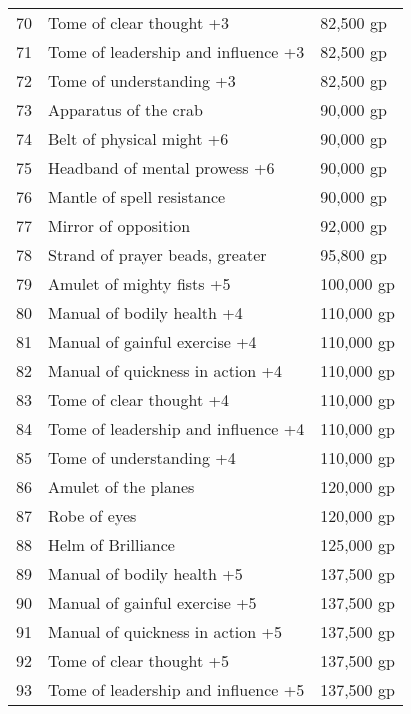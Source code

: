 \begin{table}[]
\begin{tabularx}{\linewidth}{lXl}
70  & Tome of clear thought +3                       & 82,500 gp    \\
71  & Tome of leadership and influence +3            & 82,500 gp    \\
72  & Tome of understanding +3                       & 82,500 gp    \\
73  & Apparatus of the crab                          & 90,000 gp    \\
74  & Belt of physical might +6                      & 90,000 gp    \\
75  & Headband of mental prowess +6                  & 90,000 gp    \\
76  & Mantle of spell resistance                     & 90,000 gp    \\
77  & Mirror of opposition                           & 92,000 gp    \\
78  & Strand of prayer beads, greater                & 95,800 gp    \\
79  & Amulet of mighty fists +5                      & 100,000 gp   \\
80  & Manual of bodily health +4                     & 110,000 gp   \\
81  & Manual of gainful exercise +4                  & 110,000 gp   \\
82  & Manual of quickness in action +4               & 110,000 gp   \\
83  & Tome of clear thought +4                       & 110,000 gp   \\
84  & Tome of leadership and influence +4            & 110,000 gp   \\
85  & Tome of understanding +4                       & 110,000 gp   \\
86  & Amulet of the planes                           & 120,000 gp   \\
87  & Robe of eyes                                   & 120,000 gp   \\
88  & Helm of Brilliance                             & 125,000 gp   \\
89  & Manual of bodily health +5                     & 137,500 gp   \\
90  & Manual of gainful exercise +5                  & 137,500 gp   \\
91  & Manual of quickness in action +5               & 137,500 gp   \\
92  & Tome of clear thought +5                       & 137,500 gp   \\
93  & Tome of leadership and influence +5            & 137,500 gp   \\

\end{tabularx}
\end{table}
